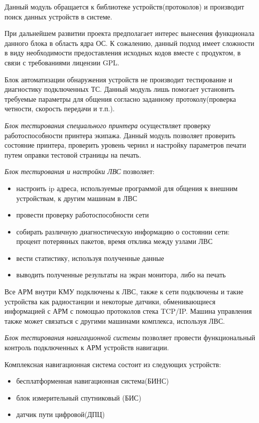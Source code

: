 Данный модуль обращается к библиотеке устройств(протоколов) и производит поиск данных устройств в системе.

При дальнейшем развитии проекта предполагает интерес вынесения функционала данного блока в область ядра ОС. К сожалению,
данный подход имеет сложности в виду необходимости предоставления исходных кодов вместе с продуктом, в связи с
требованиями лицензии GPL.

Блок автоматизации обнаружения устройств не производит тестирование и диагностику подключенных ТС. Данный модуль лишь
помогает установить требуемые параметры для общения согласно заданному протоколу\break(проверка четности, скорость передачи и
т.п.).

\textit{Блок тестирования специального принтера} осуществляет проверку работоспособности принтера экипажа. Данный модуль
позволяет проверить состояние принтера, проверить уровень чернил и настройку параметров печати путем оправки тестовой
страницы на печать.

\textit{Блок тестирования и настройки ЛВС} позволяет:
\begin{itemize}
	\item настроить ip адреса, используемые программой для общения к внешним устройствам, к другим машинам в
		ЛВС
	\item провести проверку работоспособности сети
	\item собирать различную диагностическую информацию о состоянии сети: процент потерянных
		пакетов, время отклика между узлами ЛВС
	\item вести статистику, используя полученные данные
	\item выводить полученные результаты на экран монитора, либо на печать
\end{itemize}

Все АРМ внутри КМУ подключены к ЛВС, также к сети подключены и такие устройства как радиостанции и некоторые датчики,
обменивающиеся информацией с АРМ с помощью протоколов стека TCP/IP.
Машина управления также может связаться с другими машинами комплекса, используя ЛВС.

\textit{Блок тестирования навигационной системы} позволяет провести функциональный контроль подключенных к АРМ устройств
навигации.

Комплексная навигационная система состоит из следующих устройств:
\begin{itemize}
	\item бесплатформенная навигационная система(БИНС)
	\item блок измерительный спутниковый (БИС)
	\item датчик пути цифровой(ДПЦ)
\end{itemize}


